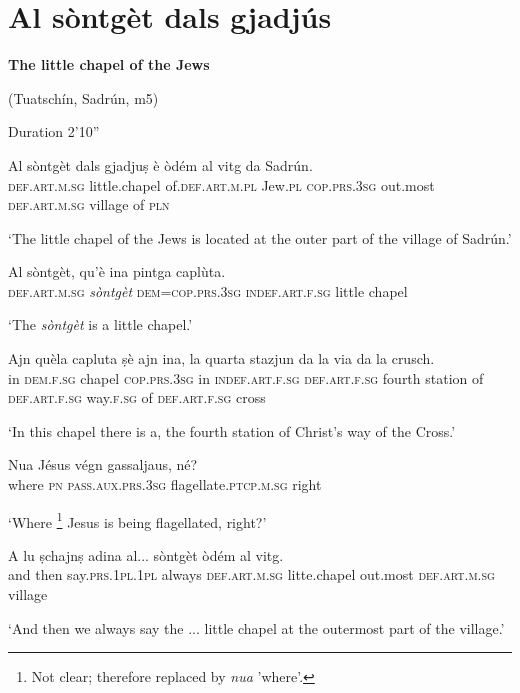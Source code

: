 \section{Al sòntgèt dals gjadjús}
\textbf{The little chapel of the Jews}

(Tuatschín, Sadrún, m5)


Duration 2'10''
\bigskip


\begin{linenumbers}
\gll Al sòntgèt dals gjadjuṣ è òdém al vitg da Sadrún.\\
 \textsc{def.art.m.sg} little.chapel of.\textsc{def.art.m.pl} Jew.\textsc{pl} \textsc{cop.prs.3sg}  out.most \textsc{def.art.m.sg} village of \textsc{pln} \\
\end{linenumbers}
\medskip
\glt `The little chapel of the Jews is located at the outer part of the village of Sadrún.'
\medskip


\begin{linenumbers}
\gll Al sòntgèt, qu’è ina pintga caplùta.\\
 \textsc{def.art.m.sg} \textit{sòntgèt} \textsc{dem=cop.prs.3sg} \textsc{indef.art.f.sg} little chapel\\
\end{linenumbers}
\medskip
\glt `The \textit{sòntgèt} is a little chapel.'
\medskip

\begin{linenumbers}
\gll Ajn quèla capluta ṣè ajn ina, la quarta stazjun da la via da la crusch.   \\
in \textsc{dem.f.sg} chapel \textsc{cop.prs.3sg} in \textsc{indef.art.f.sg} \textsc{def.art.f.sg} fourth station of \textsc{def.art.f.sg} way.\textsc{f.sg} of \textsc{def.art.f.sg} cross \\
\end{linenumbers}
\medskip
\glt `In this chapel there is a, the fourth station of Christ’s way of the Cross.'
\medskip

\begin{linenumbers}
\gll  Nua Jésus végn gassaljaus, né?  \\
where \textsc{pn} \textsc{pass.aux.prs.3sg} flagellate.\textsc{ptcp.m.sg} right \\
\end{linenumbers}
\medskip
\glt `Where \footnote{Not clear; therefore replaced by \textit{nua} 'where'.} Jesus is being flagellated, right?'
\medskip

\begin{linenumbers}
\gll A lu ṣchajnṣ adina al... sòntgèt òdém al vitg.\\
and then say.\textsc{prs.1pl.1pl} always \textsc{def.art.m.sg} litte.chapel out.most \textsc{def.art.m.sg} village   \\
\end{linenumbers}
\medskip
\glt `And then we always say the ... little chapel at the outermost part of the village.'
\medskip

